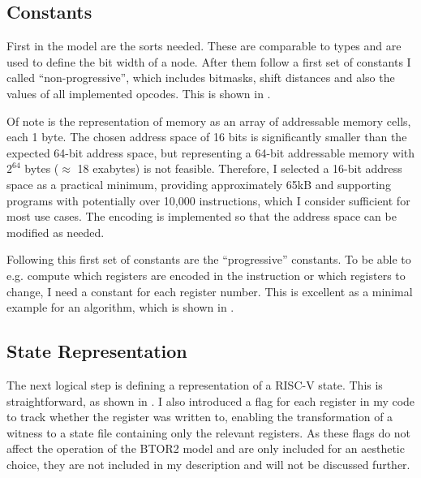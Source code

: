 \subsection{Constants}
First in the model are the sorts needed. These are comparable to
types and are used to define the bit width of a node. After them
follow a first set of constants I called \enquote{non-progressive},
which includes bitmasks, shift distances and also the values of all
implemented opcodes. This is shown in .

Of note is the representation of memory as an array of addressable
memory cells, each 1 byte. The chosen address space of 16 bits is
significantly smaller than the expected 64-bit address space, but
representing a 64-bit addressable memory with $2^{64}$ bytes
($\approx$ 18 exabytes) is not feasible. Therefore, I selected a
16-bit address space as a practical minimum, providing approximately
65kB and supporting programs with potentially over 10,000
instructions, which I consider sufficient for most use cases. The
encoding is implemented so that the address space can be modified as
needed.

Following this first set of constants are the \enquote{progressive}
constants. To be able to e.g. compute which registers are encoded in
the instruction or which registers to change, I need a constant for
each register number. This is excellent as a minimal example for an
algorithm, which is shown in .




\subsection{State Representation}
The next logical step is defining a representation of a RISC-V state.
This is straightforward, as shown in . I also
introduced a flag for each register in my code to track whether the
register was written to, enabling the transformation of a witness to
a state file containing only the relevant registers. As these flags
do not affect the operation of the BTOR2 model and are only included
for an aesthetic choice, they are not included in my description and
will not be discussed further.


